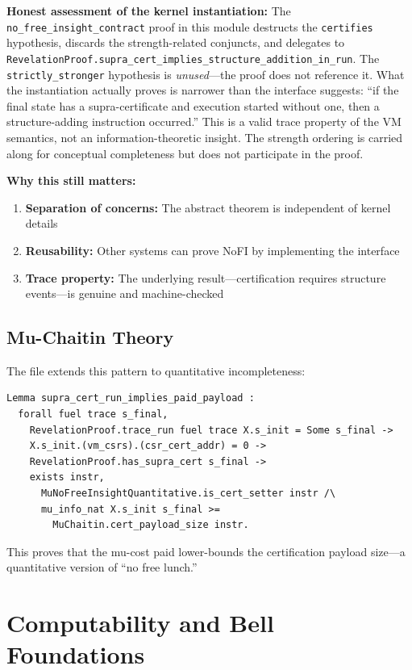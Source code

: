 \textbf{Honest assessment of the kernel instantiation:} The \texttt{no\_free\_insight\_contract} proof in this module destructs the \texttt{certifies} hypothesis, discards the strength-related conjuncts, and delegates to \texttt{RevelationProof.supra\_cert\_implies\_structure\_addition\_in\_run}. The \texttt{strictly\_stronger} hypothesis is \textit{unused}---the proof does not reference it. What the instantiation actually proves is narrower than the interface suggests: ``if the final state has a supra-certificate and execution started without one, then a structure-adding instruction occurred.'' This is a valid trace property of the VM semantics, not an information-theoretic insight. The strength ordering is carried along for conceptual completeness but does not participate in the proof.

\textbf{Why this still matters:}
\begin{enumerate}
    \item \textbf{Separation of concerns:} The abstract theorem is independent of kernel details
    \item \textbf{Reusability:} Other systems can prove NoFI by implementing the interface
    \item \textbf{Trace property:} The underlying result---certification requires structure events---is genuine and machine-checked
\end{enumerate}

\subsection{Mu-Chaitin Theory}

The  file extends this pattern to quantitative incompleteness:
\begin{lstlisting}
Lemma supra_cert_run_implies_paid_payload :
  forall fuel trace s_final,
    RevelationProof.trace_run fuel trace X.s_init = Some s_final ->
    X.s_init.(vm_csrs).(csr_cert_addr) = 0 ->
    RevelationProof.has_supra_cert s_final ->
    exists instr,
      MuNoFreeInsightQuantitative.is_cert_setter instr /\
      mu_info_nat X.s_init s_final >= 
        MuChaitin.cert_payload_size instr.
\end{lstlisting}

This proves that the mu-cost paid lower-bounds the certification payload size---a quantitative version of ``no free lunch.''

\section{Computability and Bell Foundations}


